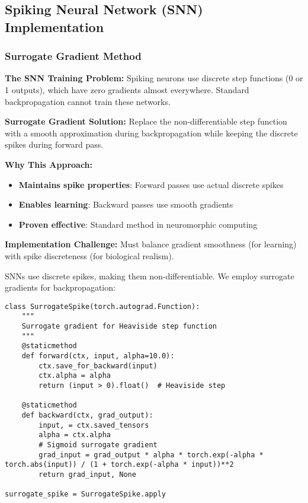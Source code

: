 \documentclass[12pt,a4paper]{article}
\begin{document}
\subsection{Spiking Neural Network (SNN) Implementation}

\subsubsection{Surrogate Gradient Method}

\textbf{The SNN Training Problem:} Spiking neurons use discrete step functions (0 or 1 outputs), which have zero gradients almost everywhere. Standard backpropagation cannot train these networks.

\textbf{Surrogate Gradient Solution:} Replace the non-differentiable step function with a smooth approximation during backpropagation while keeping the discrete spikes during forward pass.

\textbf{Why This Approach:}
\begin{itemize}
    \item \textbf{Maintains spike properties}: Forward passes use actual discrete spikes
    \item \textbf{Enables learning}: Backward passes use smooth gradients
    \item \textbf{Proven effective}: Standard method in neuromorphic computing
\end{itemize}

\textbf{Implementation Challenge:} Must balance gradient smoothness (for learning) with spike discreteness (for biological realism).

SNNs use discrete spikes, making them non-differentiable. We employ surrogate gradients for backpropagation:

\begin{lstlisting}[caption={Surrogate Gradient Implementation - Enabling SNN Training}]
class SurrogateSpike(torch.autograd.Function):
    """
    Surrogate gradient for Heaviside step function
    """
    @staticmethod
    def forward(ctx, input, alpha=10.0):
        ctx.save_for_backward(input)
        ctx.alpha = alpha
        return (input > 0).float()  # Heaviside step
    
    @staticmethod
    def backward(ctx, grad_output):
        input, = ctx.saved_tensors
        alpha = ctx.alpha
        # Sigmoid surrogate gradient
        grad_input = grad_output * alpha * torch.exp(-alpha * torch.abs(input)) / (1 + torch.exp(-alpha * input))**2
        return grad_input, None

surrogate_spike = SurrogateSpike.apply
\end{lstlisting}
\end{document}
